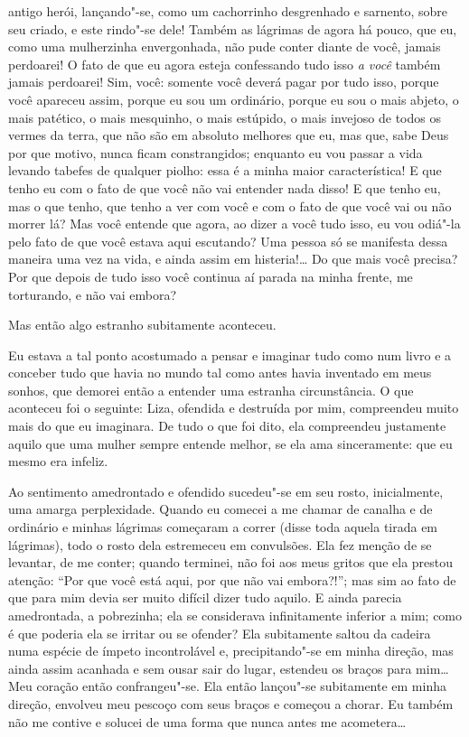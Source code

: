 antigo herói, lançando"-se, como um cachorrinho desgrenhado e sarnento,
sobre seu criado, e este rindo"-se dele! Também as lágrimas de agora há
pouco, que eu, como uma mulherzinha envergonhada, não pude conter
diante de você, jamais perdoarei! O fato de que eu agora esteja
confessando tudo isso \textit{a você} também jamais
perdoarei! Sim, você: somente você deverá pagar por tudo isso, porque
você apareceu assim, porque eu sou um ordinário, porque eu sou o mais
abjeto, o mais patético, o mais mesquinho, o mais estúpido, o mais
invejoso de todos os vermes da terra, que não são em absoluto melhores
que eu, mas que, sabe Deus por que motivo, nunca ficam constrangidos;
enquanto eu vou passar a vida levando tabefes de qualquer piolho: essa
é a minha maior característica! E que tenho eu com o fato de que você
não vai entender nada disso! E que tenho eu, mas o que tenho, que tenho
a ver com você e com o fato de que você vai ou não morrer lá? Mas você
entende que agora, ao dizer a você tudo isso, eu vou odiá"-la pelo fato
de que você estava aqui escutando? Uma pessoa só se manifesta dessa
maneira uma vez na vida, e ainda assim em histeria!\ldots{} Do que mais você
precisa? Por que depois de tudo isso você continua aí parada na minha
frente, me torturando, e não vai embora?

Mas então algo estranho subitamente aconteceu.

Eu estava a tal ponto acostumado a pensar e imaginar tudo como num livro
e a conceber tudo que havia no mundo tal como antes havia inventado em
meus sonhos, que demorei então a entender uma estranha circunstância. O
que aconteceu foi o seguinte: Liza, ofendida e destruída por mim,
compreendeu muito mais do que eu imaginara. De tudo o que foi dito, ela
compreendeu justamente aquilo que uma mulher sempre entende melhor, se
ela ama sinceramente: que eu mesmo era \mbox{infeliz}.

Ao sentimento amedrontado e ofendido sucedeu"-se em seu rosto,
inicialmente, uma amarga perplexidade. Quando eu comecei a me chamar de
canalha e de ordinário e minhas lágrimas começaram a correr (disse toda
aquela tirada em lágrimas), todo o rosto dela estremeceu em convulsões.
Ela fez menção de se levantar, de me conter; quando terminei, não foi
aos meus gritos que ela prestou atenção: “Por que você está aqui, por
que não vai embora?!”; mas sim ao fato de que para mim devia ser muito
difícil dizer tudo aquilo. E ainda parecia amedrontada, a pobrezinha;
ela se considerava infinitamente inferior a mim; como é que poderia ela
se irritar ou se ofender? Ela subitamente saltou da cadeira numa
espécie de ímpeto incontrolável e, precipitando"-se em minha direção,
mas ainda assim acanhada e sem ousar sair do lugar, estendeu os braços
para mim\ldots{} Meu coração então confrangeu"-se. Ela então lançou"-se
subitamente em minha direção, envolveu meu pescoço com seus braços e
começou a chorar. Eu também não me contive e solucei de uma forma que
nunca antes me acometera\ldots{}

